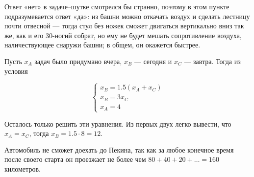 ﻿

\begin{itemize}
\itA Ответ «нет» в задаче–шутке смотрелся бы странно, поэтому в этом пункте подразумевается ответ «да»: из башни можно откачать воздух и сделать лестницу почти отвесной — тогда стул без ножек сможет двигаться вертикально вниз так же, как и его 30-ногий собрат, но ему не будет мешать сопротивление воздуха, наличествующее снаружи башни; в общем, он окажется быстрее.

\itB Пусть $x_A$ задач было придумано вчера, $x_B$ — сегодня и $x_C$ — завтра. Тогда из условия

$$
\begin{cases}
	x_B = 1.5(x_A+x_C) \\
	x_B = 3x_C \\
	x_A = 4
\end{cases}
$$

Осталось только решить эти уравнения. Из первых двух легко вывести, что $x_A = x_C$, тогда $x_B = 1.5 \cdot 8 = 12$.

\itC Автомобиль не сможет доехать до Пекина, так как за любое конечное время после своего старта он проезжает не более чем $80+40+20+\ldots=160$ километров.
\end{itemize}